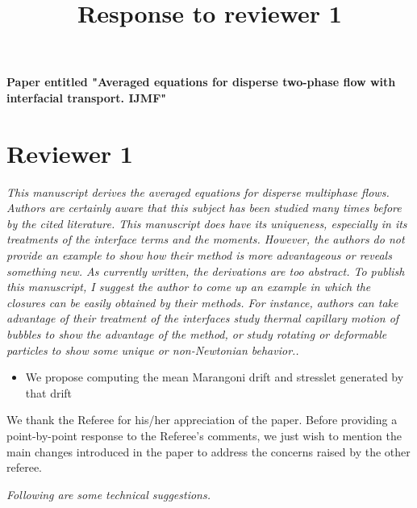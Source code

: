 \documentclass[10pt,a4paper]{article}
\newcommand{\tb}[1]{\color{blue}#1\color{black}}
\begin{document}
\title{Response to reviewer 1} 
\maketitle
\textbf{Paper entitled "Averaged equations for disperse two-phase flow with interfacial transport. IJMF"}
\bigskip

\section*{Reviewer 1}

\textit{This manuscript derives the averaged equations for disperse multiphase flows. Authors are
certainly aware that this subject has been studied many times before by the cited literature. This
manuscript does have its uniqueness, especially in its treatments of the interface terms and the
moments. However, the authors do not provide an example to show how their method is more
advantageous or reveals something new. As currently written, the derivations are too abstract. To
publish this manuscript, I suggest the author to come up an example in which the closures can be
easily obtained by their methods. For instance, authors can take advantage of their treatment of
the interfaces study thermal capillary motion of bubbles to show the advantage of the method, or
study rotating or deformable particles to show some unique or non-Newtonian behavior..}
\tb{
\begin{itemize}
    \item We propose computing the mean Marangoni drift and stresslet generated by that drift 
\end{itemize}}

We thank the Referee for his/her appreciation of the paper. 
Before providing a point-by-point response to the Referee’s comments, we just wish to mention the main changes introduced in the paper to address the concerns raised by the other referee.



\textit{Following are some technical suggestions.}
\end{document}
